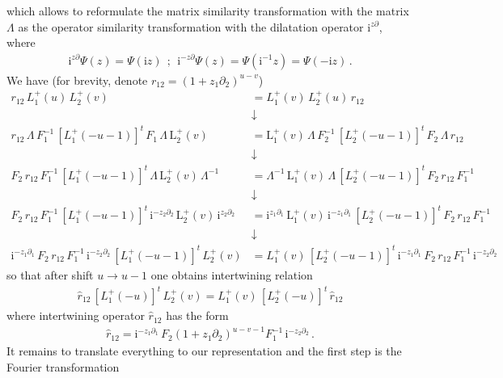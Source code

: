\documentclass[11pt]{article}
\numberwithin{equation}{section}
\theoremstyle{plain}
\theoremstyle{definition}
\def\dd{\partial}
\renewcommand{\imath}{\mathrm{i}}
\begin{document}
which allows to reformulate the matrix similarity transformation with the matrix $\Lambda$ 
as the operator similarity transformation with the dilatation operator 
$\imath^{z\partial}$, where
\begin{align*}
	\imath^{z\partial} \Psi(z) = \Psi(\imath z) \ \ ;\ \ 
	\imath^{-z\partial} \Psi(z) = \Psi( \imath^{-1} z) = \Psi(- \imath z) \,.
\end{align*}
We have (for brevity, denote $r_{12} = (1+z_{1} \dd_{2})^{u-v}$)
\begin{align*} 
	r_{12} \,
	L^{+}_{1}(u) \, L^{+}_{2}(v) &=
	L^{+}_{1}(v)\, L^{+}_{2}(u) \, r_{12} \\ 
	&\downarrow \\
	r_{12} \,
	\Lambda\,F^{-1}_1\,\left[L_1^+(-u-1)\right]^t
	\,F_1\,\Lambda\,\mathrm{L}^{+}_{2}(v) &= \mathrm{L}^{+}_{1}(v)
	\,\Lambda\,F^{-1}_2\,
	\left[L_2^+(-u-1)\right]^t\,F_2\,\Lambda\,r_{12} \\ 
	&\downarrow \\
	F_2\,r_{12}\, F^{-1}_1\,\left[L_1^+(-u-1)\right]^t
	\,\Lambda\, \mathrm{L}^{+}_{2}(v)
	\,\Lambda^{-1} &= \Lambda^{-1}\,\mathrm{L}^{+}_{1}(v)\,\Lambda
	\,\left[L_2^+(-u-1)\right]^t\,F_2\,r_{12}\,F^{-1}_1 \\ 
	&\downarrow \\ 
	F_2\,r_{12}\,F^{-1}_1\,\left[L_1^+(-u-1)\right]^t
	\,\imath^{-z_2\partial_2}\,\mathrm{L}^{+}_{2}(v)\,\imath^{z_2\partial_2}
	&= \imath^{z_1\partial_1}\,\mathrm{L}^{+}_{1}(v)\,
	\imath^{-z_1\partial_1}\,\left[L_2^+(-u-1)\right]^t
	\,F_2\,r_{12}\,F^{-1}_1 \\ 
	&\downarrow \\ 
	\imath^{-z_1\partial_1}\,F_2\,r_{12}\,F^{-1}_1\,
	\imath^{-z_2\partial_2}\,
	\left[L_1^+(-u-1)\right]^t\,L^{+}_{2}(v) &=
	L^{+}_{1}(v)\,\left[L_2^+(-u-1)\right]^t
	\,\imath^{-z_1\partial_1}\,F_2\,r_{12}\,F^{-1}_1\,\imath^{-z_2\partial_2}
\end{align*}
so that after shift $u \to u-1$ one obtains intertwining relation 
\begin{align}
	\hat{r}_{12}\,\left[L_1^+(-u)\right]^t\,L^{+}_{2}(v)
	= L^{+}_{1}(v)\,\left[L_2^+(-u)\right]^t\,\hat{r}_{12} 
\end{align}
where intertwining operator $\hat{r}_{12}$ has the form
\begin{align}
	\hat{r}_{12} = \imath^{-z_1\partial_1}\,F_2 (1+z_{1} \dd_{2})^{u-v-1} 
	F^{-1}_1\,\imath^{-z_2\partial_2}\,.
\end{align}
It remains to translate everything to our representation 
and the first step is the Fourier transformation 
\end{document}
